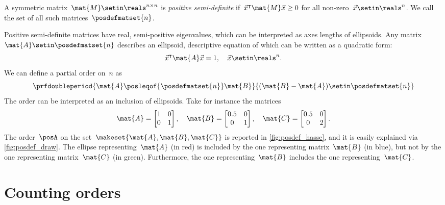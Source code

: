 \begin{definition}
    A symmetric matrix~$\mat{M}\setin \reals^{n\times n}$ is \emph{positive semi-definite} if~$\vec{x}^\intercal \mat{M}\vec{x}\geq 0$ for all non-zero~$\vec{x}\setin \reals^n$.
    We call the set of all such matrices~$\posdefmatset{n}$.
\end{definition}
Positive semi-definite matrices have real, semi-positive eigenvalues, which can be interpreted as axes lengths of ellipsoids.
Any matrix~$\mat{A}\setin \posdefmatset{n}$ describes an ellipsoid, descriptive equation of which can be written as a quadratic form:
\begin{equation}
    \vec{x}^\intercal \mat{A}\vec{x}=1,\quad \vec{x}\setin \reals^n.
\end{equation}
We can define a partial order on~$n$ as
\begin{equation}
    \prfdoubleperiod{
        \mat{A}\posleqof{\posdefmatset{n}} \mat{B}
    }{
        (\mat{B}-\mat{A})\setin \posdefmatset{n}
    }
\end{equation}
The order can be interpreted as an inclusion of ellipsoids.
Take for instance the matrices
\begin{equation}
    \mat{A}=
    \begin{bmatrix}
        1 & 0 \\0& 1
    \end{bmatrix}, \quad \mat{B}=
    \begin{bmatrix}
        0.5 & 0 \\0& 1
    \end{bmatrix},\quad \mat{C}=
    \begin{bmatrix}
        0.5 & 0 \\0& 2
    \end{bmatrix}.
\end{equation}
The order~$\posA$ on the set~$\makeset{\mat{A},\mat{B},\mat{C}}$ is reported in \cref{fig:posdef_hasse}, and it is easily explained via \cref{fig:posdef_draw}.
The ellipse representing~$\mat{A}$ (in red) is included by the one representing matrix~$\mat{B}$ (in blue), but not by the one representing matrix~$\mat{C}$ (in green).
Furthermore, the one representing~$\mat{B}$ includes the one representing~$\mat{C}$.

\section{Counting orders}


